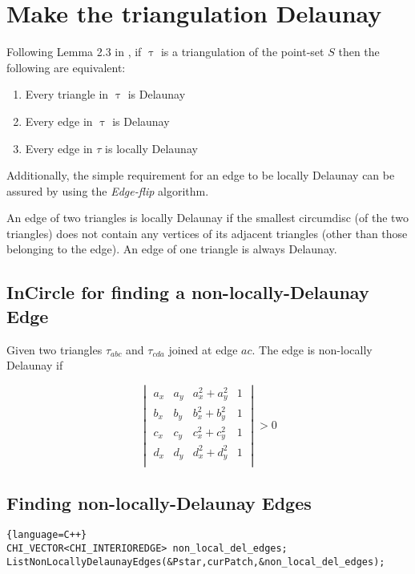 \documentclass[11pt,letterpaper,titlepage]{article}
\begin{document}
\newpage
{}
\section{Make the triangulation Delaunay}

Following Lemma 2.3 in \cite{delaunay}, if $\uptau$ is a triangulation of the point-set $S$ then the following are equivalent:

\begin{enumerate}[label=(\roman*)]
\item Every triangle in $\uptau$ is Delaunay
\item Every edge in $\uptau$ is Delaunay
\item Every edge in $\tau$ is locally Delaunay
\end{enumerate}
\noindent Additionally, the simple requirement for an edge to be locally Delaunay can be assured by using the \textit{Edge-flip} algorithm.

An edge of two triangles is locally Delaunay if the smallest circumdisc (of the two triangles) does not contain any vertices of its adjacent triangles (other than those belonging to the edge). An edge of one triangle is always Delaunay.

\subsection{InCircle for finding a non-locally-Delaunay Edge}
Given two triangles $\tau_{abc}$ and $\tau_{cda}$ joined at edge $ac$. The edge is non-locally Delaunay if 

\begin{equation*}
\begin{vmatrix}
a_x &a_y &a_x^2+a_y^2 &1 \\
b_x &b_y &b_x^2+b_y^2 &1 \\
c_x &c_y &c_x^2+c_y^2 &1 \\
d_x &d_y &d_x^2+d_y^2 &1 \\
\end{vmatrix}>0
\end{equation*}

\subsection{Finding non-locally-Delaunay Edges} 
\begin{lstlisting}{language=C++}
CHI_VECTOR<CHI_INTERIOREDGE> non_local_del_edges;
ListNonLocallyDelaunayEdges(&Pstar,curPatch,&non_local_del_edges);
\end{lstlisting}
\end{document}
